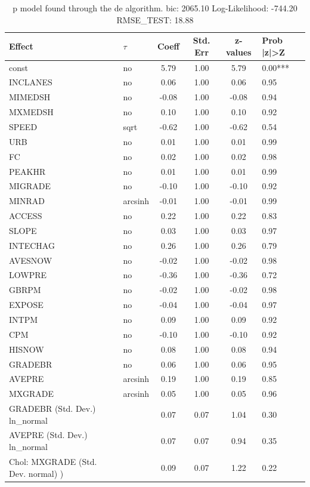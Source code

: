 \begin{table}
	\caption{p model found through the de algorithm. bic: 2065.10 Log-Likelihood: -744.20 RMSE_TEST: 18.88}
	\begin{center}
		\begin{tabular}{|l|l|c|c|c|l|}
			\hline
			Effect & $\tau$ & Coeff & Std. Err & z-values & Prob |z|>Z \\
			\hline
			const & no & 5.79 & 1.00 & 5.79 & 0.00*** \\
			\hline
			INCLANES & no & 0.06 & 1.00 & 0.06 & 0.95 \\
			\hline
			MIMEDSH & no & -0.08 & 1.00 & -0.08 & 0.94 \\
			\hline
			MXMEDSH & no & 0.10 & 1.00 & 0.10 & 0.92 \\
			\hline
			SPEED & sqrt & -0.62 & 1.00 & -0.62 & 0.54 \\
			\hline
			URB & no & 0.01 & 1.00 & 0.01 & 0.99 \\
			\hline
			FC & no & 0.02 & 1.00 & 0.02 & 0.98 \\
			\hline
			PEAKHR & no & 0.01 & 1.00 & 0.01 & 0.99 \\
			\hline
			MIGRADE & no & -0.10 & 1.00 & -0.10 & 0.92 \\
			\hline
			MINRAD & arcsinh & -0.01 & 1.00 & -0.01 & 0.99 \\
			\hline
			ACCESS & no & 0.22 & 1.00 & 0.22 & 0.83 \\
			\hline
			SLOPE & no & 0.03 & 1.00 & 0.03 & 0.97 \\
			\hline
			INTECHAG & no & 0.26 & 1.00 & 0.26 & 0.79 \\
			\hline
			AVESNOW & no & -0.02 & 1.00 & -0.02 & 0.98 \\
			\hline
			LOWPRE & no & -0.36 & 1.00 & -0.36 & 0.72 \\
			\hline
			GBRPM & no & -0.02 & 1.00 & -0.02 & 0.98 \\
			\hline
			EXPOSE & no & -0.04 & 1.00 & -0.04 & 0.97 \\
			\hline
			INTPM & no & 0.09 & 1.00 & 0.09 & 0.92 \\
			\hline
			CPM & no & -0.10 & 1.00 & -0.10 & 0.92 \\
			\hline
			HISNOW & no & 0.08 & 1.00 & 0.08 & 0.94 \\
			\hline
			GRADEBR & no & 0.06 & 1.00 & 0.06 & 0.95 \\
			\hline
			AVEPRE & arcsinh & 0.19 & 1.00 & 0.19 & 0.85 \\
			\hline
			MXGRADE & arcsinh & 0.05 & 1.00 & 0.05 & 0.96 \\
			\hline
			GRADEBR (Std. Dev.) ln_normal &  & 0.07 & 0.07 & 1.04 & 0.30 \\
			\hline
			AVEPRE (Std. Dev.) ln_normal &  & 0.07 & 0.07 & 0.94 & 0.35 \\
			\hline
			 Chol: MXGRADE (Std. Dev. normal) ) &  & 0.09 & 0.07 & 1.22 & 0.22 \\
			\hline
		\end{tabular}
	\end{center}
\end{table}